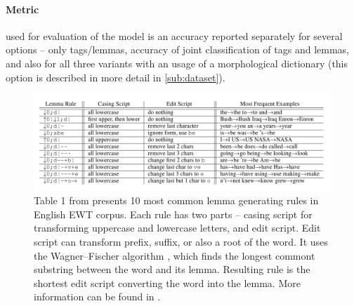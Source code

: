 \paragraph{Metric} used for evaluation of the model is an accuracy reported separately for several options -- only tags/lemmas, accuracy of joint classification of tags and lemmas, and  also for all three variants with an usage of a morphological dictionary (this option is described in more detail in \ref{sub:dataset}).

\begin{figure}[H]
\centering
\includegraphics[width=1\textwidth]{../img/lemma_rules}
\protect\caption{
Table 1 from \citep{Straka2019b} presents 10 most common lemma generating rules in English EWT corpus. Each rule has two parts -- casing script for transforming uppercase and lowercase letters, and edit script. Edit script can transform prefix, suffix, or also a root of the word. It uses the Wagner–Fischer algorithm \citep{Wagner}, which finds the longest commont substring between the word and its lemma. Resulting rule is the shortest edit script converting the word into the lemma. More information can be found in \citep{Straka2019b}.
}
\label{fig:lemma_rules}
\end{figure}

